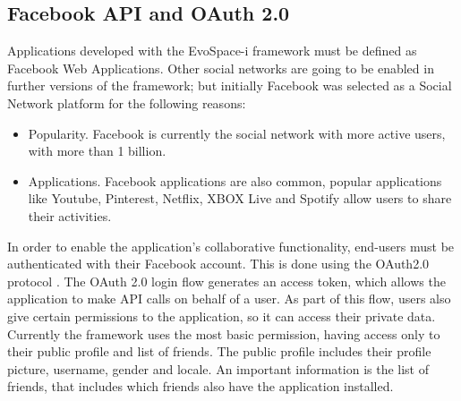\documentclass{sig-alternate}
\begin{document}
\subsection{Facebook API and OAuth 2.0}
Applications developed with the EvoSpace-i framework must be defined as Facebook Web Applications. Other social networks are going to be enabled in further versions of the framework; but initially Facebook was selected as a Social Network platform for the following reasons:
\begin{itemize}
	\item Popularity. Facebook is currently the social network with more active users, with more than 1 billion.

	\item Applications. Facebook applications are also common, popular applications like Youtube, Pinterest, Netflix, XBOX Live and Spotify allow users to share their activities.	
\end{itemize}
In order to enable the application's collaborative functionality, end-users must be authenticated with their Facebook account. This is done using the OAuth2.0 protocol \cite{hammer2011oauth}. The OAuth 2.0 login flow generates an access token, which allows the application to make API calls on behalf of a user. As part of this flow, users also give certain permissions to the application, so it can access their private data. Currently the framework uses the most basic permission, having access only to their public profile and list of friends. The public profile includes their profile picture, username, gender and locale. An important information is the list of friends, that includes which friends also have the application installed.
\end{document}
